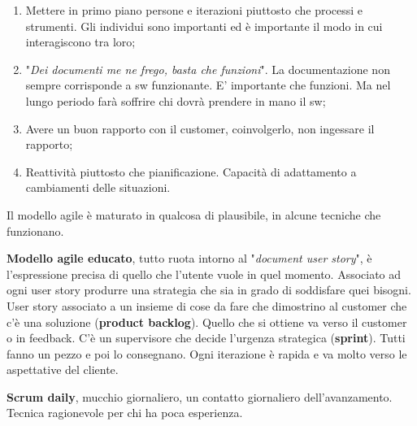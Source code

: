 \begin{enumerate}

	\item Mettere in primo piano persone e iterazioni piuttosto che processi e strumenti. Gli individui sono importanti ed è importante il modo in cui interagiscono tra loro;
	
	\item "\textit{Dei documenti me ne frego, basta che funzioni}". La documentazione non sempre corrisponde a sw funzionante. E' importante che funzioni. Ma nel lungo periodo farà soffrire chi dovrà prendere in mano il sw;
	
	\item Avere un buon rapporto con il customer, coinvolgerlo, non ingessare il rapporto;
	
	\item Reattività piuttosto che pianificazione. Capacità di adattamento a cambiamenti delle situazioni.

\end{enumerate}

Il modello agile è maturato in qualcosa di plausibile, in alcune tecniche che funzionano.

\textbf{Modello agile educato}, tutto ruota intorno al "\textit{document user story}", è l'espressione precisa di quello che l'utente vuole in quel momento. Associato ad ogni user story produrre una strategia che sia in grado di soddisfare quei bisogni. User story associato a un insieme di cose da fare che dimostrino al customer che c'è una soluzione (\textbf{product backlog}). Quello che si ottiene va verso il customer o in feedback. C'è un supervisore che decide l'urgenza strategica (\textbf{sprint}). Tutti fanno un pezzo e poi lo consegnano. Ogni iterazione è rapida e va molto verso le aspettative del cliente.

\textbf{Scrum daily}, mucchio giornaliero, un contatto giornaliero dell'avanzamento. Tecnica ragionevole per chi ha poca esperienza.

